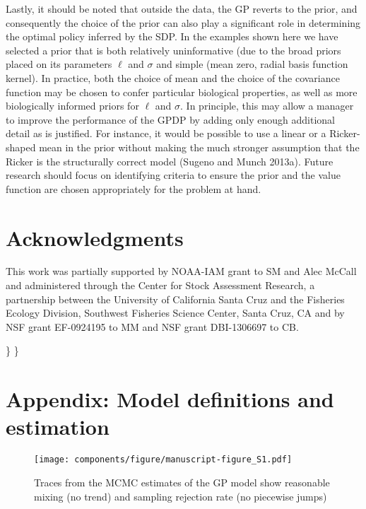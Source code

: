 \documentclass[author-year, 12pt,review]{elsarticle} %
\makeatletter
\def\maxwidth{\ifdim\Gin@nat@width>\linewidth\linewidth
\else\Gin@nat@width\fi}
\let\Oldincludegraphics\includegraphics
\renewcommand{\includegraphics}[1]{\Oldincludegraphics[width=\maxwidth]{#1}}
\makeatother
\begin{document}
Lastly, it should be noted that outside the data, the GP reverts to the
prior, and consequently the choice of the prior can also play a
significant role in determining the optimal policy inferred by the SDP.
In the examples shown here we have selected a prior that is both
relatively uninformative (due to the broad priors placed on its
parameters $\ell$ and $\sigma$ and simple (mean zero, radial basis
function kernel). In practice, both the choice of mean and the choice of
the covariance function may be chosen to confer particular biological
properties, as well as more biologically informed priors for $\ell$ and
$\sigma$. In principle, this may allow a manager to improve the
performance of the GPDP by adding only enough additional detail as is
justified. For instance, it would be possible to use a linear or a
Ricker-shaped mean in the prior without making the much stronger
assumption that the Ricker is the structurally correct model (Sugeno and
Munch 2013a). Future research should focus on identifying criteria to
ensure the prior and the value function are chosen appropriately for the
problem at hand.

\section{Acknowledgments}\label{acknowledgments}

This work was partially supported by NOAA-IAM grant to SM and Alec
McCall and administered through the Center for Stock Assessment
Research, a partnership between the University of California Santa Cruz
and the Fisheries Ecology Division, Southwest Fisheries Science Center,
Santa Cruz, CA and by NSF grant EF-0924195 to MM and NSF grant
DBI-1306697 to CB.

\appendix
\renewcommand*{\thefigure}{S\arabic{figure}}
\renewcommand*{\thetable}{S\arabic{table}} \setcounter{figure}{0}\}
\setcounter{table}{0}\}

\section{Appendix: Model definitions and
estimation}\label{appendix-model-definitions-and-estimation}

\begin{figure}[htbp]
\centering
\texttt{[image: components/figure/manuscript-figure\_S1.pdf]}
\caption{Traces from the MCMC estimates of the GP model show reasonable
mixing (no trend) and sampling rejection rate (no piecewise jumps)}
\end{figure}
\end{document}
